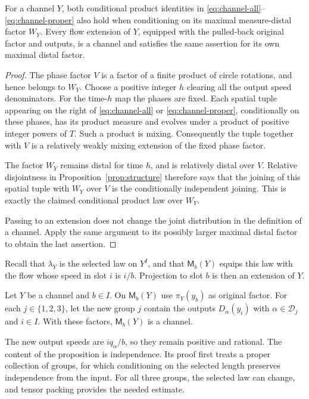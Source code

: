 \begin{lemma}\label{lem:channel-distal}
For a channel $Y$, both conditional product identities in
\eqref{eq:channel-all}--\eqref{eq:channel-proper} also hold when
conditioning on its maximal measure-distal factor $W_Y$.
Every flow extension of $Y$, equipped with the pulled-back original
factor and outputs, is a channel and satisfies the same assertion for
its own maximal distal factor.
\end{lemma}

\begin{proof}
The phase factor $V$ is a factor of a finite product of circle rotations,
and hence belongs to $W_Y$.  Choose a positive integer $h$ clearing all
the output speed denominators.  For the time-$h$ map the phases are
fixed.  Each spatial tuple appearing on the right of
\eqref{eq:channel-all} or \eqref{eq:channel-proper}, conditionally on
these phases, has its product measure and evolves under a product of
positive integer powers of $T$.  Such a product is mixing.  Consequently
the tuple together with $V$ is a relatively weakly mixing extension of
the fixed phase factor.

The factor $W_Y$ remains distal for time $h$, and is relatively distal
over $V$.  Relative disjointness in Proposition~\ref{prop:structure}
therefore says that the joining of this spatial tuple with $W_Y$ over
$V$ is the conditionally independent joining.  This is exactly the
claimed conditional product law over $W_Y$.

Passing to an extension does not change the joint distribution in the
definition of a channel.  Apply the same argument to its possibly
larger maximal distal factor to obtain the last assertion.
\end{proof}

Recall that $\lambda_Y$ is the selected law on $Y^I$, and that
$\mathsf M_b(Y)$ equips this law with the flow whose speed in slot
$i$ is $i/b$.  Projection to slot $b$ is then an extension of $Y$.

\begin{proposition}\label{prop:channel-closure}
Let $Y$ be a channel and $b\in I$.  On $\mathsf M_b(Y)$ use
$\pi_Y(y_b)$ as original factor.  For each $j\in\{1,2,3\}$, let
the new group $j$ contain the outputs $D_\alpha(y_i)$ with
$\alpha\in\mathcal D_j$ and $i\in I$.  With these factors,
$\mathsf M_b(Y)$ is a channel.
\end{proposition}

The new output speeds are $iq_\alpha/b$, so they remain positive and
rational.  The content of the proposition is independence.  Its proof
first treats a proper collection of groups, for which conditioning on
the selected length preserves independence from the input.  For all
three groups, the selected law can change, and tensor packing provides
the needed estimate.

